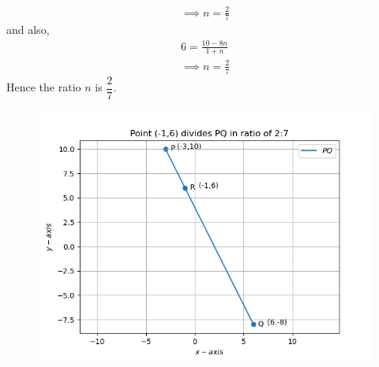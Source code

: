\documentclass[12pt]{article}
\begin{document}
\begin{enumerate}
\begin{align}
         \implies n =\frac{2}{7}
\end{align}
and also,
\begin{align}
         6 =\frac{10-8n}{1+n}\\
          \implies n =\frac{2}{7}
\end{align}
Hence the ratio $n$ is $\dfrac{2}{7}$.
\begin{figure}[!h]
 \begin{center}
  \includegraphics[width=\columnwidth]{figs/Figure_1.png}
 \end{center}
\caption{}
\label{fig:Fig1}
\end{figure}
\end{enumerate}
\end{document}

